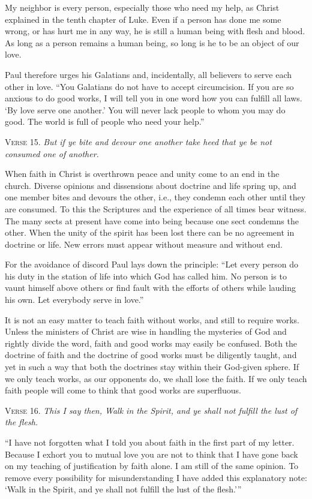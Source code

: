 My neighbor is every person, especially those who need my help, as Christ explained in the tenth chapter of Luke. Even if a person has done me some wrong, or has hurt me in any way, he is still a human being with flesh and blood. As long as a person remains a human being, so long is he to be an object of our love.

Paul therefore urges his Galatians and, incidentally, all believers to serve each other in love. “You Galatians do not have to accept circumcision. If you are so anxious to do good works, I will tell you in one word how you can fulfill all laws. ‘By love serve one another.’ You will never lack people to whom you may do good. The world is full of people who need your help.”

\textsc{Verse} 15. \emph{But if ye bite and devour one another take heed that ye be not consumed one of another.}

When faith in Christ is overthrown peace and unity come to an end in the church. Diverse opinions and dissensions about doctrine and life spring up, and one member bites and devours the other, i.e., they condemn each other until they are consumed. To this the Scriptures and the experience of all times bear witness. The many sects at present have come into being because one sect condemns the other. When the unity of the spirit has been lost there can be no agreement in doctrine or life. New errors must appear without measure and without end.

For the avoidance of discord Paul lays down the principle: “Let every person do his duty in the station of life into which God has called him. No person is to vaunt himself above others or find fault with the efforts of others while lauding his own. Let everybody serve in love.”

It is not an easy matter to teach faith without works, and still to require works. Unless the ministers of Christ are wise in handling the mysteries of God and rightly divide the word, faith and good works may easily be confused. Both the doctrine of faith and the doctrine of good works must be diligently taught, and yet in such a way that both the doctrines stay within their God-given sphere. If we only teach works, as our opponents do, we shall lose the faith. If we only teach faith people will come to think that good works are superfluous.

\textsc{Verse} 16. \emph{This I say then, Walk in the Spirit, and ye shall not fulfill the lust of the flesh.}

“I have not forgotten what I told you about faith in the first part of my letter. Because I exhort you to mutual love you are not to think that I have gone back on my teaching of justification by faith alone. I am still of the same opinion. To remove every possibility for misunderstanding I have added this explanatory note: ‘Walk in the Spirit, and ye shall not fulfill the lust of the flesh.’”

